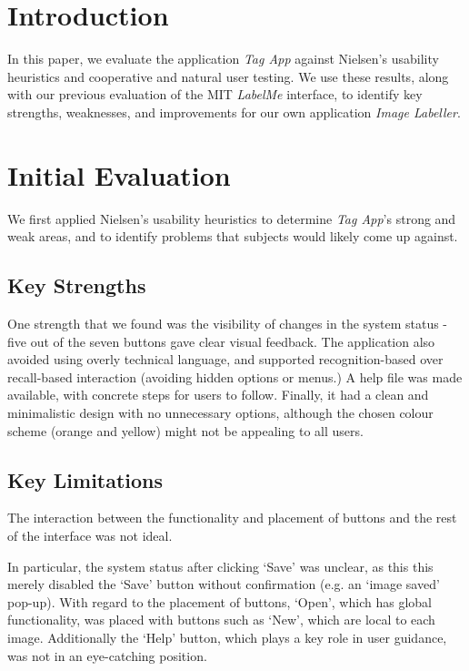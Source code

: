\documentclass[11pt,twocolumn]{article}
\title{\thetitle}
\author{\theauthor}
\date{\today}
\begin{document}
\maketitle
\thispagestyle{empty}

\section{Introduction}

In this paper, we evaluate the application \emph{Tag App} against Nielsen’s
usability heuristics and cooperative and natural user testing. We use these
results, along with our previous evaluation of the MIT \emph{LabelMe}
interface, to identify key strengths, weaknesses, and improvements for our own
application \emph{Image Labeller}.

\section{Initial Evaluation}

We first applied Nielsen’s usability heuristics\cite{nielsen1994} to
determine \emph{Tag App}’s strong and weak areas, and to identify problems that
subjects would likely come up against.

\subsection{Key Strengths}

One strength that we found was the visibility of changes in the system status -
five out of the seven buttons gave clear visual feedback. The application also
avoided using overly technical language, and supported recognition-based over
recall-based interaction (avoiding hidden options or menus.) A help file was
made available, with concrete steps for users to follow. Finally, it had a
clean and minimalistic design with no unnecessary options, although the chosen
colour scheme (orange and yellow) might not be appealing to all users. 

\subsection{Key Limitations}

The interaction between the functionality and placement of buttons and the rest
of the interface was not ideal.

In particular, the system status after clicking `Save' was unclear, as this
this merely disabled the `Save' button without confirmation (e.g. an `image
saved' pop-up). With regard to the placement of buttons, `Open', which has
global functionality, was placed with buttons such as `New', which are local to
each image. Additionally the `Help' button, which plays a key role in user
guidance, was not in an eye-catching position. 
\end{document}
